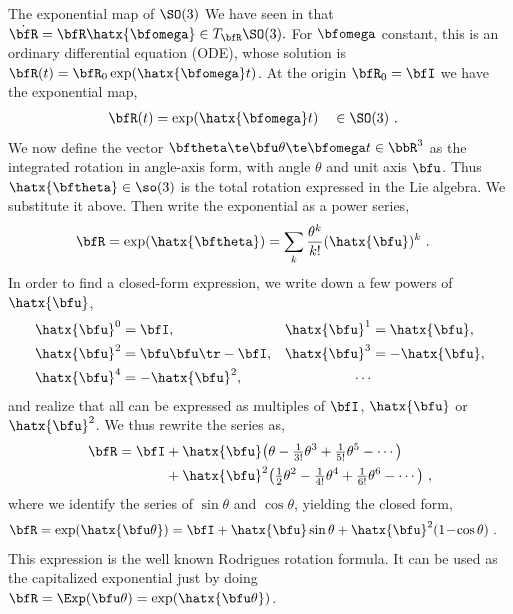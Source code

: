 
\begin{fexample}{The exponential map of $\SO(3)$}
\label{ex:SO3_exp}
%
%
We have seen in  that 
$
\dot\bfR = \bfR\hatx{\bfomega}  \in \mtanat{\SO(3)}{\bfR}.
$
%
For $\bw$ constant, this is an ordinary differential equation (ODE), whose solution is $\bfR(t) = \bfR_0\exp(\hatx{\bfomega}t)$. At the origin $\bfR_0=\bfI$ we have the exponential map,
%
\begin{align*}
\bfR(t) &= \exp(\hatx{\bfomega}t) && \in\SO(3)
~. 
\end{align*}
%
We now define the vector $\bth\te\bfu\theta \te \bfomega t\in\bbR^3$ as the integrated rotation in angle-axis form, with angle $\theta$ and unit axis $\bfu$. 
Thus $\hatx{\bth}\in\so(3)$ is the total rotation expressed in the Lie algebra.
We substitute it above. 
Then write the exponential as a power series,
%
\begin{align*}
\bfR &= \exp(\hatx{\bth})= \sum_k\frac{\theta^k}{k!}{(\hatx{\bfu})^k} 
~.
\end{align*}
%
In order to find a closed-form expression, we write down a few powers of $\hatx{\bfu}$,
%
\begin{align*}
\hatx{\bfu}^0&= \bfI,
&
\hatx{\bfu}^1&= \hatx{\bfu},
\\
\hatx{\bfu}^2&= \bfu\bfu\tr -\bfI,
&
\hatx{\bfu}^3&=-\hatx{\bfu},
\\
\hatx{\bfu}^4&=-\hatx{\bfu}^2,
&
\cdots
\end{align*}
%
and realize that all can be expressed as multiples of $\bfI$, $\hatx{\bfu}$ or $\hatx{\bfu}^2$.
We thus rewrite the series as,
%
\begin{align*}
\bfR = \bfI &+ \hatx{\bfu}\big(\theta - \tfrac1{3!}\theta^3 + \tfrac1{5!}\theta^5 - \cdots\big) \\
  &+ \hatx{\bfu}^2\big(\tfrac12\theta^2-\tfrac1{4!}\theta^4+\tfrac1{6!}\theta^6-\cdots\big)
  ~,
\end{align*}
%
where we identify the series of $\sin\theta$ and $\cos\theta$, yielding the closed form,
%
\begin{align*}
\bfR=\exp(\hatx{\bfu\theta}) &= 
\bfI + \hatx{\bfu}\sin\theta + \hatx{\bfu}^2(1\!-\!\cos\theta)
~.
\end{align*}
%
This expression is the well known Rodrigues rotation formula.
It can be used as the capitalized exponential just by doing $\bfR=\Exp(\bfu\theta)=\exp(\hatx{\bfu\theta})$.
\end{fexample}
